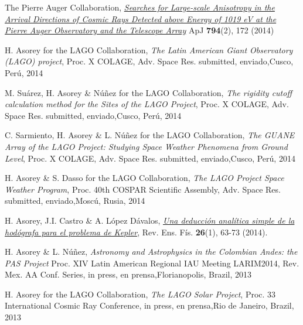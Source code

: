 \begin{etaremune}
\item {}The Pierre Auger Collaboration, \href{http://dx.doi.org/10.1088/0004-637X/794/2/172}{\emph{Searches for Large-scale Anisotropy in the Arrival Directions of Cosmic Rays Detected above Energy of 1019 eV at the Pierre Auger Observatory and the Telescope Array}} ApJ {\bf{794}}(2), 172 (2014)

\item {}H. Asorey for the LAGO Collaboration, {\emph{The Latin American Giant Observatory (LAGO) project}}, \en Proc. X COLAGE, Adv. Space Res. \ifeng submitted, \else enviado,\fi  Cusco, Perú, 2014

\item {}M. Suárez, H. Asorey \& Núñez for the LAGO Collaboration, {\emph{The rigidity cutoff calculation method for the Sites of the LAGO Project}}, \en Proc. X COLAGE, Adv. Space Res. \ifeng submitted, \else enviado,\fi  Cusco, Perú, 2014

\item {}C. Sarmiento, H. Asorey \& L. Núñez for the LAGO Collaboration, {\emph{The GUANE Array of the LAGO Project: Studying Space Weather Phenomena from Ground Level}}, \en Proc. X COLAGE, Adv. Space Res. \ifeng submitted, \else enviado,\fi  Cusco, Perú, 2014

\item {}H. Asorey \& S. Dasso for the LAGO Collaboration, {\emph{The LAGO Project Space Weather Program}}, \en Proc. 40th COSPAR Scientific Assembly, Adv. Space Res. \ifeng submitted, \else enviado,\fi  Moscú, Rusia, 2014

\item {}H. Asorey, J.I. Castro \& A. López Dávalos, \href{http://www.revistas.unc.edu.ar/index.php/revistaEF/article/view/9512}{\emph{Una deducción analítica simple de la hodógrafa para el problema de Kepler}}, Rev. Ens. Fís. {\bf{26}}(1), 63-73 (2014).

\item {}H. Asorey \& L. Núñez, {\emph{Astronomy and Astrophysics in the Colombian Andes: the PAS Project}} \en Proc. XIV Latin American Regional IAU Meeting LARIM2014, Rev. Mex. AA Conf. Series, \ifeng in press, \else en prensa,\fi  Florianopolis, Brazil, 2013

\item {}H. Asorey for the LAGO Collaboration, {\emph{The LAGO Solar Project}}, \en Proc. 33 International Cosmic Ray Conference, \ifeng in press, \else en prensa,\fi  Rio de Janeiro, Brazil, 2013


\end{etaremune}
